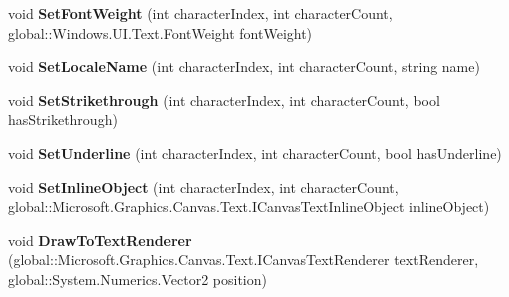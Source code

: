 \begin{DoxyCompactItemize}
\item 
\mbox{\label{interface_microsoft_1_1_graphics_1_1_canvas_1_1_text_1_1_i_canvas_text_layout_aa79822a15fdf118523f58709bb123fc4}} 
void {\bfseries Set\+Font\+Weight} (int character\+Index, int character\+Count, global\+::\+Windows.\+U\+I.\+Text.\+Font\+Weight font\+Weight)
\item 
\mbox{\label{interface_microsoft_1_1_graphics_1_1_canvas_1_1_text_1_1_i_canvas_text_layout_a3ae7da339881c3d01eebeec801a99775}} 
void {\bfseries Set\+Locale\+Name} (int character\+Index, int character\+Count, string name)
\item 
\mbox{\label{interface_microsoft_1_1_graphics_1_1_canvas_1_1_text_1_1_i_canvas_text_layout_adf262145bc6d14b65076e7bb974b82d4}} 
void {\bfseries Set\+Strikethrough} (int character\+Index, int character\+Count, bool has\+Strikethrough)
\item 
\mbox{\label{interface_microsoft_1_1_graphics_1_1_canvas_1_1_text_1_1_i_canvas_text_layout_a629390d20f6e2f22860ca237e72881ee}} 
void {\bfseries Set\+Underline} (int character\+Index, int character\+Count, bool has\+Underline)
\item 
\mbox{\label{interface_microsoft_1_1_graphics_1_1_canvas_1_1_text_1_1_i_canvas_text_layout_a36f4e4337bca474c30dbc45e8e5271af}} 
void {\bfseries Set\+Inline\+Object} (int character\+Index, int character\+Count, global\+::\+Microsoft.\+Graphics.\+Canvas.\+Text.\+I\+Canvas\+Text\+Inline\+Object inline\+Object)
\item 
\mbox{\label{interface_microsoft_1_1_graphics_1_1_canvas_1_1_text_1_1_i_canvas_text_layout_ae1ee823236a004edbcb90267c853b058}} 
void {\bfseries Draw\+To\+Text\+Renderer} (global\+::\+Microsoft.\+Graphics.\+Canvas.\+Text.\+I\+Canvas\+Text\+Renderer text\+Renderer, global\+::\+System.\+Numerics.\+Vector2 position)

\end{DoxyCompactItemize}
